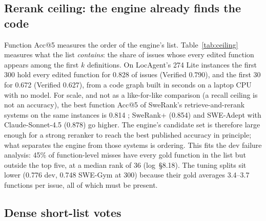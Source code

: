 \documentclass[10pt,twocolumn]{article}
\makeatletter
\newcommand{\accat}[1]{Acc@#1}
\makeatother
\begin{document}
\subsection{Rerank ceiling: the engine already finds the code}
\label{sec:ceiling}



Function \accat{5} measures the order of the engine's list. Table~\ref{tab:ceiling} measures what the
list \emph{contains}: the share of issues whose every edited function appears among the first $k$
definitions. On LocAgent's 274 Lite instances the first 300 hold every edited function for 0.828 of
issues (Verified 0.790), and the first 30 for 0.672 (Verified 0.627), from a code graph built in
seconds on a laptop CPU with no model. For scale, and not as a like-for-like comparison (a recall
ceiling is not an accuracy), the best function \accat{5} of SweRank's retrieve-and-rerank systems
on the same instances is 0.814 \citep{reddy2026swerank}; SweRank+ (0.854) and SWE-Adept with
Claude-Sonnet-4.5 (0.878) go higher. The engine's candidate set is therefore large enough for a
strong reranker to reach the best published accuracy in principle; what separates the engine from
those systems is ordering. This fits the dev failure analysis: 45\% of function-level misses have
every gold function in the list but outside the top five, at a median rank of 36 (log~\S8.18). The
tuning splits sit lower (0.776 dev, 0.748 SWE-Gym at 300) because their gold averages 3.4--3.7
functions per issue, all of which must be present.

\subsection{Dense short-list votes}
\label{sec:dense}



\end{document}
